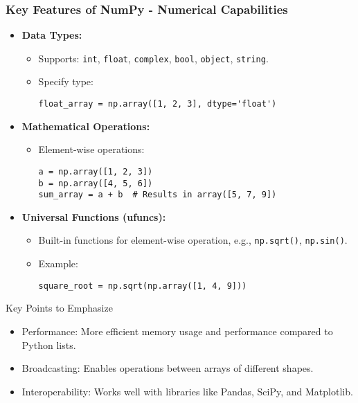 \documentclass[aspectratio=169]{beamer}
\begin{document}
\begin{frame}[fragile]
    \frametitle{Key Features of NumPy - Numerical Capabilities}
    \begin{itemize}
        \item \textbf{Data Types:}
        \begin{itemize}
            \item Supports: \texttt{int}, \texttt{float}, \texttt{complex}, \texttt{bool}, \texttt{object}, \texttt{string}.
            \item Specify type: 
            \begin{lstlisting}
float_array = np.array([1, 2, 3], dtype='float')
            \end{lstlisting}
        \end{itemize}
        \item \textbf{Mathematical Operations:}
        \begin{itemize}
            \item Element-wise operations:
            \begin{lstlisting}
a = np.array([1, 2, 3])
b = np.array([4, 5, 6])
sum_array = a + b  # Results in array([5, 7, 9])
            \end{lstlisting}
        \end{itemize}
        \item \textbf{Universal Functions (ufuncs):}
        \begin{itemize}
            \item Built-in functions for element-wise operation, e.g., \texttt{np.sqrt()}, \texttt{np.sin()}.
            \item Example:
            \begin{lstlisting}
square_root = np.sqrt(np.array([1, 4, 9]))
            \end{lstlisting}
        \end{itemize}
    \end{itemize}
\begin{block}{Key Points to Emphasize}
    \begin{itemize}
        \item Performance: More efficient memory usage and performance compared to Python lists.
        \item Broadcasting: Enables operations between arrays of different shapes.
        \item Interoperability: Works well with libraries like Pandas, SciPy, and Matplotlib.
    \end{itemize}
\end{block}
\end{frame}
\end{document}
